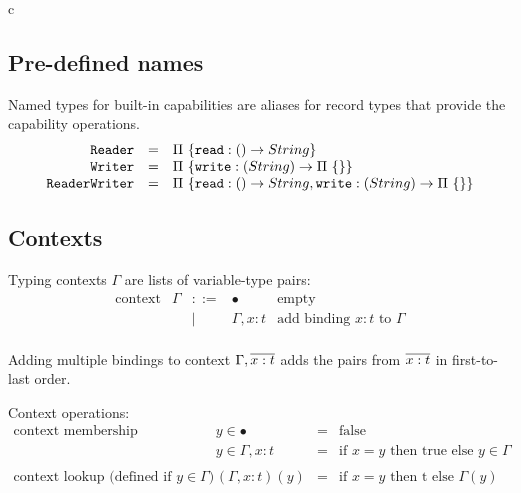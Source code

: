 \documentclass[11pt]{article}
\newcommand{\kw}[1]{\mathtt{#1}}
\begin{document}
\begin{rules}{c}


\end{rules}

\subsection{Pre-defined names}

Named types for built-in capabilities are aliases for record types that provide the capability operations.
\[
\begin{array}{rcl}
\kw{Reader} & = &
\recty{\{ \kw{read} :\funty{}{String} \}} \\

\kw{Writer} & = &
\recty{\{ \kw{write} :\funty{String}{\recty{\rowety}} \}} \\

\kw{ReaderWriter} & = &
\recty{\{ \kw{read} :\funty{}{String}, \kw{write} :\funty{String}{\recty{\rowety} \}}}
\end{array}
\]

\subsection{Contexts}

\newcommand{\bnd}[2]{#1 : #2}
\newcommand{\bnds}[2]{\repo{#1 : #2}}
\newcommand{\nilc}{\bullet}
\newcommand{\consc}[2]{#1,#2}

Typing contexts $\Gamma$ are lists of variable-type pairs:
\[
\begin{array}{rlcll}
\text{context}
  & \Gamma & ::= & \nilc                      & \text{empty} \\
  &        & |   & \consc{\Gamma}{\bnd{x}{t}} & \text{add binding $x:t$ to $\Gamma$} \\
\end{array}
\]

Adding multiple bindings to context $\consc{\Gamma}{\bnds{x}{t}}$ adds the pairs from $\bnds{x}{t}$ in first-to-last order.

Context operations:
\[
\begin{array}{rrcll}
\text{context membership}
  & y \in \nilc                      & = & \text{false} \\
  & y \in \consc{\Gamma}{\bnd{x}{t}} & = & \text{if $x = y$ then true else $y \in \Gamma$} \\
\\
\text{context lookup (defined if $y \in \Gamma$)}
  & (\consc{\Gamma}{\bnd{x}{t}})(y) & = & \text{if $x = y$ then t else $\Gamma(y)$} \\
\end{array}
\]
\end{document}
